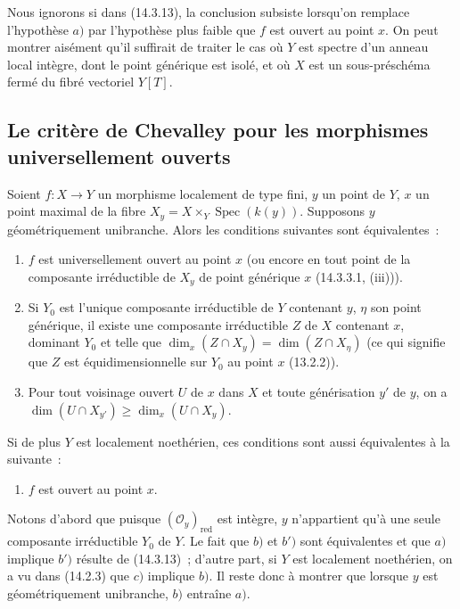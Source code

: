 \begin{remark}[14.3.14]
\label{IV.14.3.14-fr}
Nous ignorons si dans (14.3.13), la conclusion subsiste lorsqu'on remplace
l'hypothèse $a)$ par l'hypothèse plus faible que $f$ est ouvert au point $x$. On
peut montrer aisément qu'il suffirait de traiter le cas où $Y$ est spectre d'un
anneau local intègre, dont le point générique est isolé, et où $X$ est un
sous-préschéma fermé du fibré vectoriel $Y[T]$.
\end{remark}

\subsection{Le critère de Chevalley pour les morphismes universellement ouverts}
\label{subsection:IV.14.4-fr}

\begin{theorem}[14.4.1]
\label{IV.14.4.1-fr}
Soient $f:X\to Y$ un morphisme localement de type fini, $y$ un point de $Y$, $x$
un point maximal de la fibre $X_y=X\times_Y\operatorname{Spec}(k(y))$. Supposons
$y$ géométriquement unibranche. Alors les conditions suivantes sont équivalentes~:
\begin{enumerate}[label=\emph{\alph*)}]
  \item $f$ est universellement ouvert au point $x$ (ou encore en tout point de la
  composante irréductible de $X_y$ de point générique $x$ (14.3.3.1, (iii))).


  \item Si $Y_0$ est l'unique composante irréductible de $Y$ contenant $y$, $\eta$
  son point générique, il existe une composante irréductible $Z$ de $X$ contenant
  $x$, dominant $Y_0$ et telle que
  $\dim_x(Z\cap X_y)=\dim(Z\cap X_\eta)$ (ce qui signifie que $Z$ est
  équidimensionnelle sur $Y_0$ au point $x$ (13.2.2)).
  \item[b$'$)] Pour tout voisinage ouvert $U$ de $x$ dans $X$ et toute
  générisation $y'$ de $y$, on a
  $\dim(U\cap X_{y'})\geq\dim_x(U\cap X_y)$.
\end{enumerate}
Si de plus $Y$ est localement noethérien, ces conditions sont aussi équivalentes à
la suivante~:
\begin{enumerate}[label=\emph{\alph*)}]
  \item[c)] $f$ est ouvert au point $x$.
\end{enumerate}
\end{theorem}

Notons d'abord que puisque $(\mathcal O_y)_{\mathrm{red}}$ est intègre, $y$
n'appartient qu'à une seule composante irréductible $Y_0$ de $Y$. Le fait que $b)$
et $b')$ sont équivalentes et que $a)$ implique $b')$ résulte de (14.3.13)~;
d'autre part, si $Y$ est localement noethérien, on a vu dans (14.2.3) que $c)$
implique $b)$. Il reste donc à montrer que lorsque $y$ est géométriquement
unibranche, $b)$ entraîne $a)$.

